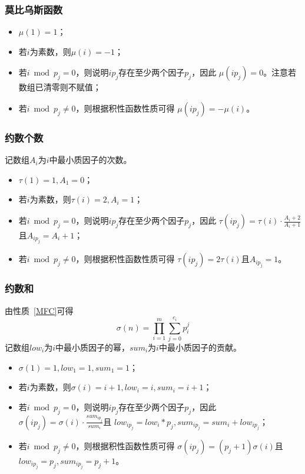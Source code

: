 \subsubsection{莫比乌斯函数}
\begin{itemize}
	\item $\mu(1)=1$；
	\item 若$i$为素数，则$\mu(i)=-1$；
	\item 若$i \bmod p_j=0$，则说明$ip_j$存在至少两个因子$p_j$，因此
	      $\mu(ip_j)=0$。注意若数组已清零则不赋值；
	\item 若$i \bmod p_j\neq 0$，则根据积性函数性质可得
	      $\mu(ip_j)=-\mu(i)$。
\end{itemize}
\subsubsection{约数个数}
记数组$A_i$为$i$中最小质因子的次数。
\begin{itemize}
	\item $\tau(1)=1,A_1=0$；
	\item 若$i$为素数，则$\tau(i)=2,A_i=1$；
	\item 若$i \bmod p_j=0$，则说明$ip_j$存在至少两个因子$p_j$，因此
	      $\tau(ip_j)=\tau(i)\cdot\frac{A_i+2}{A_i+1}$且$A_{ip_j}=A_i+1$；
	\item 若$i \bmod p_j\neq 0$，则根据积性函数性质可得
	      $\tau(ip_j)=2\tau(i)$且$A_{ip_j}=1$。
\end{itemize}
\subsubsection{约数和}
由性质~\ref{MFC}可得
\begin{displaymath}
	\sigma(n)=\prod_{i=1}^m{\sum_{j=0}^{c_i}{p_i^j}}
\end{displaymath}
记数组$low_i$为$i$中最小质因子的幂，$sum_i$为$i$中最小质因子的贡献。
\begin{itemize}
	\item $\sigma(1)=1,low_1=1,sum_1=1$；
	\item 若$i$为素数，则$\sigma(i)=i+1,low_i=i,sum_i=i+1$；
	\item 若$i \bmod p_j=0$，则说明$ip_j$存在至少两个因子$p_j$，因此
	      $\sigma(ip_j)=\sigma(i)\cdot\frac{sum_{ip_j}}{sum_i}$且
	      $low_{ip_j}=low_i*p_j,sum_{ip_j}=sum_i+low_{ip_j}$；
	\item 若$i \bmod p_j\neq 0$，则根据积性函数性质可得
	      $\sigma(ip_j)=(p_j+1)\sigma(i)$且
	      $low_{ip_j}=p_j,sum_{ip_j}=p_j+1$。
\end{itemize}
